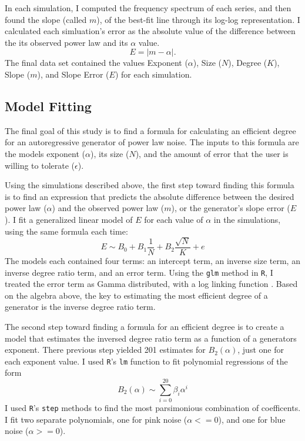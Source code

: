 \documentclass[preprint]{JASA}
\begin{document}
In each simulation, I computed the frequency spectrum of each series, and then found the slope (called $m$), of the best-fit line through its log-log representation.
I calculated each simluation's error as the absolute value of the difference between the its observed power law and its $\alpha$ value.
\begin{equation}
  \label{error_definition}
  E = \left|m - \alpha\right|.
\end{equation}
The final data set contained the values Exponent ($\alpha$), Size ($N$), Degree ($K$), Slope ($m$), and Slope Error ($E$) for each simulation.

\subsection{Model Fitting}

The final goal of this study is to find a formula for calculating an efficient degree for an autoregressive generator of power law noise.
The inputs to this formula are the models exponent ($\alpha$), its size ($N$), and the amount of error that the user is willing to tolerate ($\epsilon$).

Using the simulations described above, the first step toward finding this formula is to find an expression that predicts the absolute difference between the desired power law ($\alpha$) and the observed power law ($m$), or the generator's slope error ($E$).
I fit a generalized linear model of $E$ for each value of $\alpha$ in the simulations, using the same formula each time:
\begin{equation}
  \label{glm_of_error}
  E \sim B_0 + B_1\frac{1}{N} + B_2\frac{\sqrt{N}}{K} + e
\end{equation}
The models each contained four terms: an intercept term, an inverse size term, an inverse degree ratio term, and an error term.
Using the \texttt{glm} method in \texttt{R}, I treated the error term as Gamma distributed, with  a log linking function \citep{rcoreteam:2020}.
Based on the algebra above, the key to estimating the most efficient degree of a generator is the inverse degree ratio term.

The second step toward finding a formula for an efficient degree is to create a model that estimates the inversed degree ratio term as a function of a generators exponent.
There previous step yielded 201 estimates for $B_2(\alpha)$, just one for each exponent value.
I used \texttt{R}'s \texttt{lm} function to fit polynomial regressions of the form
\begin{equation}
  \label{coefficient_model}
  B_2(\alpha) \sim \sum_{i=0}^{20}{\beta_i \alpha^i}
\end{equation}
I used \texttt{R}'s \texttt{step} methods to find the most parsimonious combination of coefficents.
I fit two separate polynomials, one for pink noise ($\alpha <= 0$), and one for blue noise ($\alpha >= 0$).
\end{document}
